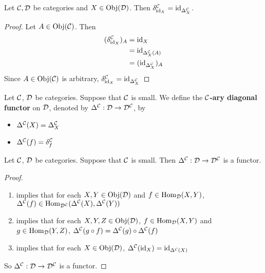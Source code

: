 \documentclass{book}
\begin{document}
	\begin{ex} 
		Let $\mathcal{C}, \mathcal{D}$ be categories and $X \in \operatorname{Obj}(\mathcal{D})$. Then $\delta^{\mathcal{C}}_{\operatorname{id}_X} = \operatorname{id}_{\Delta^{\mathcal{C}}_X}$.
	\end{ex}

	\begin{proof}
		Let $A \in \operatorname{Obj}(\mathcal{C})$. Then 
		\begin{align*}
			(\delta^{\mathcal{C}}_{\operatorname{id}_X})_A
			& = \operatorname{id}_X \\
			& = \operatorname{id}_{\Delta^{\mathcal{C}}_X(A)} \\
			& = (\operatorname{id}_{\Delta^{\mathcal{C}}_X})_A 
		\end{align*}
		Since $A \in \operatorname{Obj}(\mathcal{C})$ is arbitrary, $\delta^{\mathcal{C}}_{\operatorname{id}_X} = \operatorname{id}_{\Delta^{\mathcal{C}}_X}$
	\end{proof}

	\begin{defn} 
		Let $\mathcal{C}$, $\mathcal{D}$ be categories. Suppose that $\mathcal{C}$ is small. We define the \textbf{$\mathcal{C}$-ary diagonal functor} on $\mathcal{D}$, denoted by $\Delta^{\mathcal{C}}: \mathcal{D} \rightarrow \mathcal{D}^{\mathcal{C}}$, by
		\begin{itemize}
			\item $\Delta^{\mathcal{C}}(X) = \Delta^{\mathcal{C}}_X$
			\item $\Delta^{\mathcal{C}}(f) = \delta^{\mathcal{C}}_f$
		\end{itemize}
	\end{defn}

	\begin{ex} 
		Let $\mathcal{C}$, $\mathcal{D}$ be categories. Suppose that $\mathcal{C}$ is small. Then $\Delta^{\mathcal{C}}: \mathcal{D} \rightarrow \mathcal{D}^{\mathcal{C}}$ is a functor.
	\end{ex}

	\begin{proof}\
		\begin{enumerate}
			\item {} implies that for each $X, Y \in \operatorname{Obj}(\mathcal{D})$ and $f \in \operatorname{Hom}_{\mathcal{D}}(X, Y)$, $\Delta^{\mathcal{C}}(f) \in \operatorname{Hom}_{\mathcal{D}^{\mathcal{C}}} (\Delta^{\mathcal{C}}(X), \Delta^{\mathcal{C}}(Y))$
			\item \rex{14010} implies that for each $X, Y, Z \in \operatorname{Obj}(\mathcal{D})$, $f \in \operatorname{Hom}_{\mathcal{D}}(X, Y)$ and $g \in \operatorname{Hom}_{\mathcal{D}}(Y, Z)$, $\Delta^{\mathcal{C}}(g \circ f) = \Delta^{\mathcal{C}}(g) \circ \Delta^{\mathcal{C}}(f)$
			\item \rex{14011} implies that for each $X \in \operatorname{Obj}(\mathcal{D})$, $\Delta^{\mathcal{C}}(\operatorname{id}_X) = \operatorname{id}_{\Delta^{\mathcal{C}}(X)}$
		\end{enumerate}
		 So $\Delta^{\mathcal{C}} : \mathcal{D} \rightarrow \mathcal{D}^{\mathcal{C}}$ is a functor.
	\end{proof}
\end{document}

